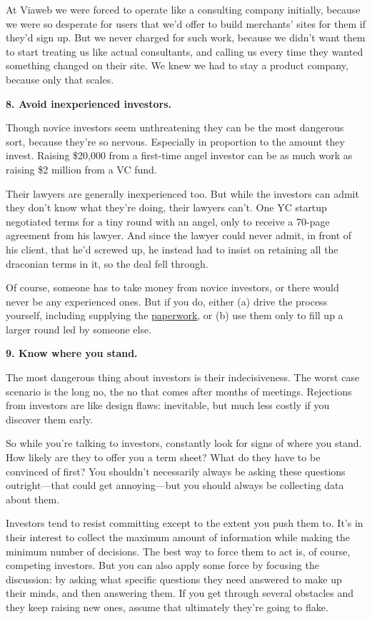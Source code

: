 At Viaweb we were forced to operate like a consulting company initially,
because we were so desperate for users that we'd offer to build
merchants' sites for them if they'd sign up. But we never charged for
such work, because we didn't want them to start treating us like actual
consultants, and calling us every time they wanted something changed on
their site. We knew we had to stay a product company, because only that
scales.

\textbf{8. Avoid inexperienced investors.}

Though novice investors seem unthreatening they can be the most
dangerous sort, because they're so nervous. Especially in proportion to
the amount they invest. Raising \$20,000 from a first-time angel
investor can be as much work as raising \$2 million from a VC fund.

Their lawyers are generally inexperienced too. But while the investors
can admit they don't know what they're doing, their lawyers can't. One
YC startup negotiated terms for a tiny round with an angel, only to
receive a 70-page agreement from his lawyer. And since the lawyer could
never admit, in front of his client, that he'd screwed up, he instead
had to insist on retaining all the draconian terms in it, so the deal
fell through.

Of course, someone has to take money from novice investors, or there
would never be any experienced ones. But if you do, either (a) drive the
process yourself, including supplying the
\href{http://ycombinator.com/seriesaa.html}{paperwork}, or (b) use them
only to fill up a larger round led by someone else.

\textbf{9. Know where you stand.}

The most dangerous thing about investors is their indecisiveness. The
worst case scenario is the long no, the no that comes after months of
meetings. Rejections from investors are like design flaws: inevitable,
but much less costly if you discover them early.

So while you're talking to investors, constantly look for signs of where
you stand. How likely are they to offer you a term sheet? What do they
have to be convinced of first? You shouldn't necessarily always be
asking these questions outright---that could get annoying---but you
should always be collecting data about them.

Investors tend to resist committing except to the extent you push them
to. It's in their interest to collect the maximum amount of information
while making the minimum number of decisions. The best way to force them
to act is, of course, competing investors. But you can also apply some
force by focusing the discussion: by asking what specific questions they
need answered to make up their minds, and then answering them. If you
get through several obstacles and they keep raising new ones, assume
that ultimately they're going to flake.

